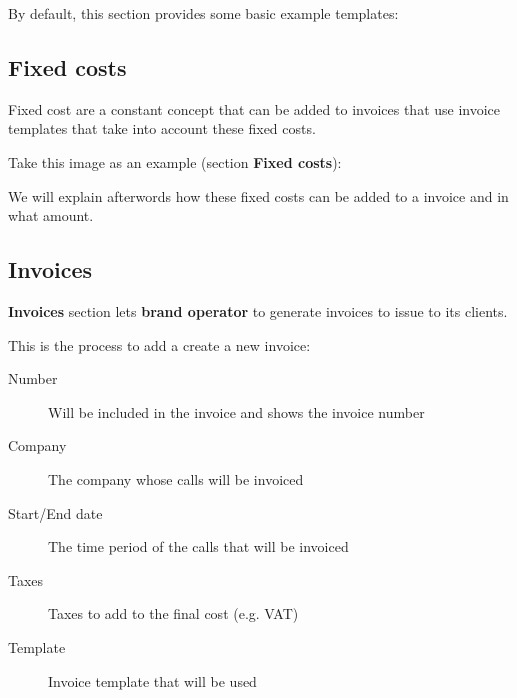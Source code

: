 \documentclass[letterpaper,10pt,english]{sphinxmanual}
\begin{document}
By default, this section provides some basic example templates:

\noindent{}


\subsection{Fixed costs}
\label{brand/invoices/fixed_costs:fixed-costs}\label{brand/invoices/fixed_costs::doc}
Fixed cost are a constant concept that can be added to invoices that use invoice
templates that take into account these fixed costs.

Take this image as an example (section \textbf{Fixed costs}):

\noindent{}

We will explain afterwords how these fixed costs can be added to a invoice and
in what amount.


\subsection{Invoices}
\label{brand/invoices/invoices:invoices}\label{brand/invoices/invoices::doc}
\textbf{Invoices} section lets \textbf{brand operator} to generate invoices to issue to its
clients.

This is the process to add a create a new invoice:

\begin{description}
\item[{Number}] \leavevmode{}\label{brand/invoices/invoices:term-number}
Will be included in the invoice and shows the invoice number

\item[{Company}] \leavevmode{}\label{brand/invoices/invoices:term-company}
The company whose calls will be invoiced

\item[{Start/End date}] \leavevmode{}\label{brand/invoices/invoices:term-start-end-date}
The time period of the calls that will be invoiced

\item[{Taxes}] \leavevmode{}\label{brand/invoices/invoices:term-taxes}
Taxes to add to the final cost (e.g. VAT)

\item[{Template}] \leavevmode{}\label{brand/invoices/invoices:term-template}
Invoice template that will be used

\end{description}
\end{document}
